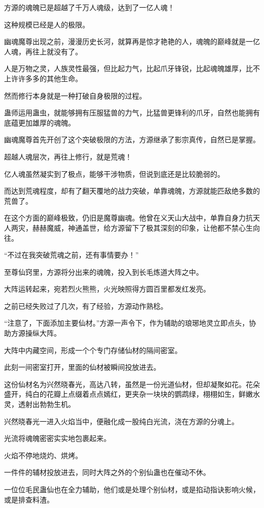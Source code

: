 \begin{this_body}
方源的魂魄已是超越了千万人魂级，达到了一亿人魂！

这种规模已经是人的极限。

幽魂魔尊出现之前，漫漫历史长河，就算再是惊才艳艳的人，魂魄的巅峰就是一亿人魂，再往上就没有了。

人是万物之灵，人族灵性最强，但比起力气，比起爪牙锋锐，比起魂魄雄厚，比不上许许多多的其他生命。

然而修行本身就是一种打破自身极限的过程。

蛊师运用蛊虫，就能够拥有压服猛兽的力气，比猛兽更锋利的爪牙，自然也能拥有底蕴更加雄厚的魂魄。

幽魂魔尊首先开创了这个突破极限的方法，方源继承了影宗真传，自然已是掌握。

超越人魂层次，再往上修行，就是荒魂！

亿人魂虽然凝实到了极点，能够干涉物质，但说到底还是比较脆弱的。

而达到荒魂程度，却有了翻天覆地的战力突破，单靠魂魄，方源就能匹敌绝多数的荒兽了。

在这个方面的巅峰极致，仍旧是魔尊幽魂。他曾在义天山大战中，单靠自身力抗天人两灾，赫赫魔威，神通盖世，给方源留下了极其深刻的印象，让他都不禁心生向往。

“不过在我突破荒魂之前，还有事情要办！”

至尊仙窍里，方源将分出来的魂魄，投入到长毛炼道大阵之中。

大阵运转起来，宛若烈火熊熊，火光映照得方圆百里都发红发亮。

之前已经失败过了几次，有了经验，方源动作熟稔。

“注意了，下面添加主要仙材。”方源一声令下，作为辅助的琅琊地灵立即点头，协助方源操纵大阵。

大阵中内藏空间，形成一个个专门存储仙材的隔间密室。

此刻一间密室打开，里面的仙材被瞬间投放进去。

这份仙材名为兴然晓春光，高达八转，虽然是一份光道仙材，但却凝聚如花。花朵盛开，纯白的花瓣上点缀着点点嫣红，更夹杂一块块的鹦鹉绿，栩栩如生，鲜嫩水灵，透射出勃勃生机。

兴然晓春光一进入火焰当中，便融化成一股纯白光流，浇在方源的分魂上。

光流将魂魄密密实实地包裹起来。

火焰不停地烧灼、烘烤。

一件件的辅材投放进去，同时大阵之外的个别仙蛊也在催动不休。

一位位毛民蛊仙也在全力辅助，他们或是处理个别仙材，或是掐动指诀影响火候，或是排查料渣。


\end{this_body}
